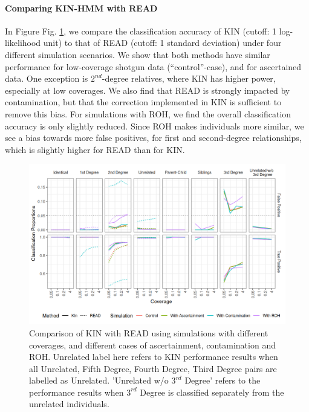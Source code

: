 \documentclass[12pt, letterpaper]{article}
\begin{document}
\paragraph{Comparing KIN-HMM with READ}
In Figure Fig. \ref{fig3:Comparison_READ_KIN}, we compare the classification accuracy of KIN (cutoff: 1 log-likelihood unit) to that of READ (cutoff: 1 standard deviation)  under four different simulation scenarios. We show that both methods have similar performance for low-coverage shotgun data (``control''-case),  and for ascertained data. One exception is  $2^{nd}$-degree relatives, where KIN has higher power, especially at low coverages. We also find that READ is strongly impacted by contamination, but that the correction implemented in KIN is sufficient to remove this bias. For simulations with ROH, we find the overall classification accuracy is only slightly reduced. Since ROH makes individuals more similar, we see a bias towards more false positives, for first and second-degree relationships, which is slightly higher for READ than for KIN.

\begin{figure}[h!]
    \includegraphics[width=16cm]{plots/plotimg/comparison_plot.png}
    \centering
    \caption{Comparison of KIN with READ using simulations with different coverages, and different cases of ascertainment, contamination and ROH. Unrelated label here refers to KIN performance results when all Unrelated, Fifth Degree, Fourth Degree, Third Degree pairs are labelled as Unrelated. 'Unrelated w/o $3^{rd}$ Degree' refers to the performance results when $3^{rd}$ Degree is classified separately from the unrelated individuals.}
    \label{fig3:Comparison_READ_KIN}
\end{figure}
\end{document}
